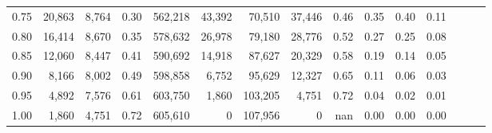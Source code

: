 \begin{tabular}{rrrrrrrrrrrrrrr}
0.75 &  20,863 &  8,764 &  0.30 &  562,218 &   43,392 &   70,510 &   37,446 &  0.46 &  0.35 &  0.40 &      0.11 \\
0.80 &  16,414 &  8,670 &  0.35 &  578,632 &   26,978 &   79,180 &   28,776 &  0.52 &  0.27 &  0.25 &      0.08 \\
0.85 &  12,060 &  8,447 &  0.41 &  590,692 &   14,918 &   87,627 &   20,329 &  0.58 &  0.19 &  0.14 &      0.05 \\
0.90 &   8,166 &  8,002 &  0.49 &  598,858 &    6,752 &   95,629 &   12,327 &  0.65 &  0.11 &  0.06 &      0.03 \\
0.95 &   4,892 &  7,576 &  0.61 &  603,750 &    1,860 &  103,205 &    4,751 &  0.72 &  0.04 &  0.02 &      0.01 \\
1.00 &   1,860 &  4,751 &  0.72 &  605,610 &        0 &  107,956 &        0 &   nan &  0.00 &  0.00 &      0.00 \\
\bottomrule
\end{tabular}
